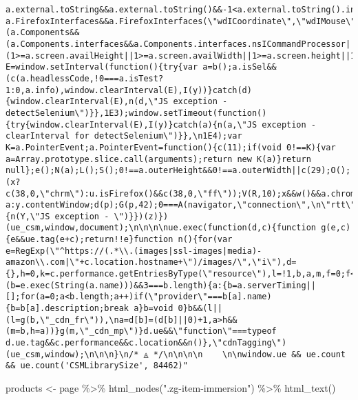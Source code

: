 \documentclass[
]{article}
\newenvironment{Shaded}{\begin{snugshade}}{\end{snugshade}}
\newcommand{\FunctionTok}[1]{\textcolor[rgb]{0.00,0.00,0.00}{#1}}
\newcommand{\NormalTok}[1]{#1}
\newcommand{\OtherTok}[1]{\textcolor[rgb]{0.56,0.35,0.01}{#1}}
\newcommand{\SpecialCharTok}[1]{\textcolor[rgb]{0.00,0.00,0.00}{#1}}
\newcommand{\StringTok}[1]{\textcolor[rgb]{0.31,0.60,0.02}{#1}}
\begin{document}
\begin{verbatim}
a.external.toString&&a.external.toString()&&-1<a.external.toString().indexOf(\"RuntimeObject\")&&c(8);\na.FirefoxInterfaces&&\"function\"===typeof a.FirefoxInterfaces&&a.FirefoxInterfaces(\"wdICoordinate\",\"wdIMouse\",\"wdIStatus\")&&c(2);a.XPCOMUtils&&c(9);(a.Components&&(a.Components.interfaces&&a.Components.interfaces.nsICommandProcessor||a.Components.wdICoordinate||a.Components.wdIMouse||a.Components.wdIStatus||a.Components.classes)||a.netscape&&a.netscape.security&&a.netscape.security.privilegemanager)&&c(8);a.isExternalUrlSafeForNavigation&&c(1);!a.opera||null===a.opera._browserjsran||0!==a.opera._browserjsran&&\n!1!==a.opera._browserjsran||c(4);a.screen&&(1>=a.screen.availHeight||1>=a.screen.availWidth||1>=a.screen.height||1>=a.screen.width||0>=a.screen.devicePixelRatio)&&c(10);var E=window.setInterval(function(){try{var a=b();a.isSel&&(c(a.headlessCode,!0===a.isTest?1:0,a.info),window.clearInterval(E),I(y))}catch(d){window.clearInterval(E),n(d,\"JS exception - detectSelenium\")}},1E3);window.setTimeout(function(){try{window.clearInterval(E),I(y)}catch(a){n(a,\"JS exception - clearInterval for detectSelenium\")}},\n1E4);var K=a.PointerEvent;a.PointerEvent=function(){c(11);if(void 0!==K){var a=Array.prototype.slice.call(arguments);return new K(a)}return null};e();N(a);L();S();0!==a.outerHeight&&0!==a.outerWidth||c(29);O();!w()||navigator.plugins&&0!=navigator.plugins.length||(x?c(38,0,\"chrm\"):u.isFirefox()&&c(38,0,\"ff\"));V(R,10);x&&w()&&a.chrome&&!a.chrome.csi&&!a.chrome.loadTimes&&c(25);z();y=J(null,Math.random().toString(36).substr(2));p=v(y,\"contentWindow\")?a:y.contentWindow;d(p);G(p,42);0===A(navigator,\"connection\",\n\"rtt\")&&c(44);P();Q()}catch(Y){n(Y,\"JS exception - \")}})(z)})(ue_csm,window,document);\n\n\n\nue.exec(function(d,c){function g(e,c){e&&ue.tag(e+c);return!!e}function n(){for(var e=RegExp(\"^https://(.*\\.(images|ssl-images|media)-amazon\\.com|\"+c.location.hostname+\")/images/\",\"i\"),d={},h=0,k=c.performance.getEntriesByType(\"resource\"),l=!1,b,a,m,f=0;f<k.length;f++)if(a=k[f],0<a.transferSize&&a.transferSize>=a.encodedBodySize&&(b=e.exec(String(a.name)))&&3===b.length){a:{b=a.serverTiming||[];for(a=0;a<b.length;a++)if(\"provider\"===b[a].name){b=b[a].description;break a}b=void 0}b&&(l||(l=g(b,\"_cdn_fr\")),\na=d[b]=(d[b]||0)+1,a>h&&(m=b,h=a))}g(m,\"_cdn_mp\")}d.ue&&\"function\"===typeof d.ue.tag&&c.performance&&c.location&&n()},\"cdnTagging\")(ue_csm,window);\n\n\n}\n/* ◬ */\n\n\n\n    \n\nwindow.ue && ue.count && ue.count('CSMLibrarySize', 84462)"
\end{verbatim}

\begin{Shaded}
\begin{Highlighting}[]
\NormalTok{products }\OtherTok{\textless{}{-}}\NormalTok{ page }\SpecialCharTok{\%\textgreater{}\%}
  \FunctionTok{html\_nodes}\NormalTok{(}\StringTok{".zg{-}item{-}immersion"}\NormalTok{) }\SpecialCharTok{\%\textgreater{}\%}
  \FunctionTok{html\_text}\NormalTok{()}
\end{Highlighting}
\end{Shaded}
\end{document}
